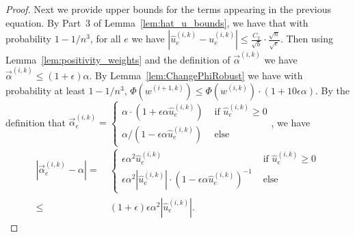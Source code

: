 \documentclass[11pt]{article}
\newcommand\uu{\boldsymbol{\mathit{u}}}
\newcommand\ww{\boldsymbol{\mathit{w}}}
\newcommand{\wh}{\widehat}
\begin{document}
\begin{proof}
Next we provide upper bounds for the terms appearing in the previous equation. By Part~3 of Lemma~\ref{lem:hat_u_bounds}, we have that with probability $1-1/n^3$, for all $e$ we have $|\wh{\uu}^{(i,k)}_e - \uu^{(i,k)}_e| \leq \frac{C_2}{\sqrt{b}} \cdot \frac{\sqrt{n}}{\sqrt{\epsilon}}$. Then using Lemma~\ref{lem:positivity_weights} and the definition of $\overrightarrow{\alpha}^{(i,k)}$ we have $\overrightarrow{\alpha}^{(i,k)} \leq (1 + \epsilon) \alpha$. By Lemma~\ref{lem:ChangePhiRobust} we have with probability at least $1-1/n^3$, $\Phi(\ww^{(i+1,k)}) \leq \Phi(\ww^{(i,k)}) \cdot (1 + 10 \epsilon \alpha)$. By the definition that $\overrightarrow{\alpha}^{(i,k)}_e = \begin{cases}
\alpha \cdot (1 + \epsilon\alpha \wh{\uu}^{(i,k)}_e) & \text{ if } \wh{\uu}^{(i,k)}_e \geq 0\\
\alpha / (1 - \epsilon\alpha \wh{\uu}^{(i,k)}_e) & \text{ else }
\end{cases}$, we have 
\begin{align*}
|\overrightarrow{\alpha}^{(i,k)}_e - \alpha| = &~ \begin{cases}
\epsilon \alpha^2 \wh{\uu}^{(i,k)}_e & \text{ if } \wh{\uu}^{(i,k)}_e \geq 0\\
\epsilon \alpha^2 |\wh{\uu}^{(i,k)}_e| \cdot
(1 - \epsilon \alpha \wh{\uu}^{(i,k)}_e)^{-1} & \text{ else }
\end{cases} \\
\leq &~ (1 + \epsilon) \epsilon \alpha^2 |\wh{\uu}^{(i,k)}_e|.
\end{align*}




\end{proof}
\end{document}
